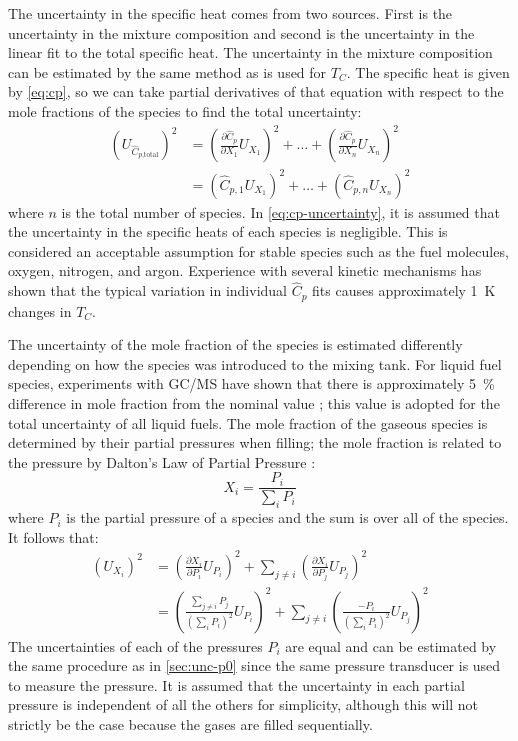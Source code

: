 \documentclass[../main.tex]{subfiles}
\begin{document}
The uncertainty in the specific heat comes from two sources. First is the
uncertainty in the mixture composition and second is the uncertainty in
the linear fit to the total specific heat. The uncertainty in the mixture
composition can be estimated by the same method as is used for $T_C$. The
specific heat is given by \cref{eq:cp}, so we can take partial derivatives
of that equation with respect to the mole fractions of the species to find
the total uncertainty:
%
\begin{equation}
\label{eq:cp-uncertainty}
\begin{split}
\left(U_{\hat{C}_{p\text{,total}}}\right)^2 &= \left(\frac{\partial \hat{C}_p}{\partial X_1} U_{X_1}\right)^2 + \ldots + \left(\frac{\partial \hat{C}_p}{\partial X_n} U_{X_n}\right)^2 \\
&= \left(\hat{C}_{p,1} U_{X_1}\right)^2 + \ldots + \left(\hat{C}_{p,n} U_{X_n}\right)^2
\end{split}
\end{equation}
%
where $n$ is the total number of species. In \cref{eq:cp-uncertainty},
it is assumed that the uncertainty in the specific heats of each species
is negligible. This is considered an acceptable assumption for stable species
such as the fuel molecules, oxygen, nitrogen, and argon. Experience with
several kinetic mechanisms has shown that the typical variation in individual
$\hat{C}_p$ fits causes approximately \SI{1}{\kelvin} changes in $T_C$.

The uncertainty of the mole fraction of the species is estimated differently
depending on how the species was introduced to the mixing tank. For liquid fuel
species, experiments with GC/MS have shown that there is approximately \SI{5}{\percent}
difference in mole fraction from the nominal value \cite{Weber2011}; this value is adopted for
the total uncertainty of all liquid fuels. The mole fraction of the gaseous species
is determined by their partial pressures when filling; the mole fraction is
related to the pressure by Dalton's Law of Partial Pressure
\cite{Dalton1801,Gillespie1930}:
%
\begin{equation}
X_i = \frac{P_i}{\sum_i P_i}
\end{equation}
%
where $P_i$ is the partial pressure of a species and the sum is over all
of the species. It follows that:
%
\begin{equation}
\begin{split}
\left(U_{X_i}\right)^2 &= \left(\frac{\partial X_i}{\partial P_i} U_{P_i}\right)^2 + \sum_{j\neq i} \left(\frac{\partial X_i}{\partial P_j}U_{P_j}\right)^2\\
&= \left(\frac{\sum_{j \neq i} P_j}{\left(\sum_i P_i\right)^2}U_{P_i}\right)^2 + \sum_{j \neq i}\left(\frac{{-P_i}}{\left(\sum_i P_i\right)^2} U_{P_j}\right)^2
\end{split}
\end{equation}
%
The uncertainties of each of the pressures $P_i$ are equal and can be estimated by
the same procedure as in \cref{sec:unc-p0} since the same pressure transducer
is used to measure the pressure. It is assumed that the uncertainty in
each partial pressure is independent of all the others for simplicity,
although this will not strictly be the case because the gases are filled
sequentially.
\end{document}
